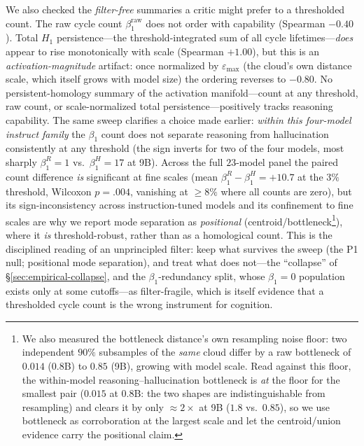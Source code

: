 \documentclass{article}
\begin{document}
We also checked the \emph{filter-free} summaries a critic might prefer to a thresholded count. The raw
cycle count $\beta_1^{\text{raw}}$ does not order with capability (Spearman $-0.40$). Total $H_1$
persistence---the threshold-integrated sum of all cycle lifetimes---\emph{does} appear to rise
monotonically with scale (Spearman $+1.00$), but this is an \emph{activation-magnitude} artifact: once
normalized by $\varepsilon_{\max}$ (the cloud's own distance scale, which itself grows with model size)
the ordering reverses to $-0.80$. No persistent-homology summary of the activation manifold---count at
any threshold, raw count, or scale-normalized total persistence---positively tracks reasoning
capability. The same sweep clarifies a choice made earlier: \emph{within this four-model instruct
family} the $\beta_1$ count does not separate reasoning from hallucination consistently at any
threshold (the sign inverts for two of the four models, most sharply $\beta_1^{R}=1$ vs.\
$\beta_1^{H}=17$ at 9B). Across the full $23$-model panel the paired count difference \emph{is}
significant at fine scales (mean $\beta_1^{R}-\beta_1^{H}=+10.7$ at the $3\%$ threshold, Wilcoxon
$p=.004$, vanishing at $\geq 8\%$ where all counts are zero), but its sign-inconsistency across
instruction-tuned models and its confinement to fine scales are why we report mode separation as
\emph{positional} (centroid/bottleneck\footnote{We also measured the bottleneck distance's own
resampling noise floor: two independent $90\%$ subsamples of the \emph{same} cloud differ by a raw
bottleneck of $0.014$ (0.8B) to $0.85$ (9B), growing with model scale. Read against this floor,
the within-model reasoning--hallucination bottleneck is \emph{at} the floor for the smallest pair
($0.015$ at 0.8B: the two shapes are indistinguishable from resampling) and clears it by only
$\approx\!2\times$ at 9B ($1.8$ vs.\ $0.85$), so we use bottleneck as corroboration at the largest
scale and let the centroid/union evidence carry the positional claim.}), where it \emph{is}
threshold-robust, rather than as a homological count. This is the disciplined reading of an
unprincipled filter: keep what survives the sweep (the P1 null; positional mode separation), and treat
what does not---the ``collapse'' of \S\ref{sec:empirical-collapse}, and the $\beta_1$-redundancy split,
whose $\beta_1{=}0$ population exists only at some cutoffs---as filter-fragile, which is itself evidence
that a thresholded cycle count is the wrong instrument for cognition.
\end{document}
